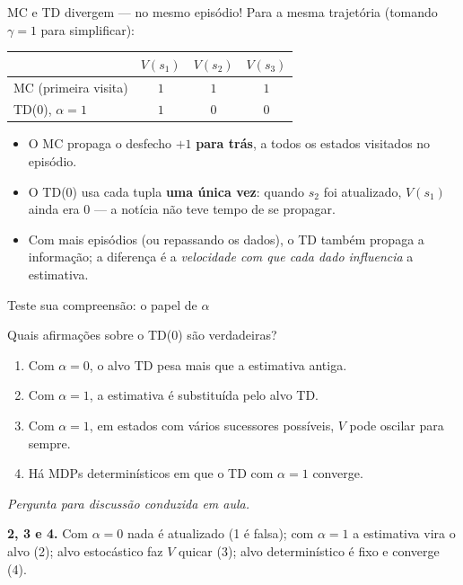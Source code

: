 \documentclass[aspectratio=169, 11pt]{beamer}
\newcommand{\paradiscussao}{\vspace{-0.2em}
  {\footnotesize\color{rlCinza}\itshape Pergunta para discussão conduzida em aula.}}
\begin{document}
\begin{frame}{MC e TD divergem — no mesmo episódio!}
  Para a mesma trajetória (tomando $\gamma = 1$ para simplificar):
  \begin{center}
  \renewcommand{\arraystretch}{1.3}
  \begin{tabular}{lccc}
    & $V(s_1)$ & $V(s_2)$ & $V(s_3)$ \\ \hline
    MC (primeira visita) & $1$ & $1$ & $1$ \\
    TD(0), $\alpha = 1$  & $1$ & $0$ & $0$ \\
  \end{tabular}
  \end{center}

  \begin{itemize}
    \item O MC propaga o desfecho $+1$ \textbf{para trás}, a todos os
      estados visitados no episódio.
    \item O TD(0) usa cada tupla \textbf{uma única vez}: quando $s_2$ foi
      atualizado, $V(s_1)$ ainda era $0$ — a notícia não teve tempo de
      se propagar.
    \item Com mais episódios (ou repassando os dados), o TD também propaga
      a informação; a diferença é a \emph{velocidade com que cada dado
      influencia} a estimativa.
  \end{itemize}
\end{frame}

\begin{frame}{Teste sua compreensão: o papel de $\alpha$}
  \begin{quizbox}{}
    Quais afirmações sobre o TD(0) são verdadeiras?
    \begin{enumerate}\setlength{\itemsep}{0ex}
      \item Com $\alpha = 0$, o alvo TD pesa mais que a estimativa antiga.
      \item Com $\alpha = 1$, a estimativa é substituída pelo alvo TD.
      \item Com $\alpha = 1$, em estados com vários sucessores possíveis,
        $V$ pode oscilar para sempre.
      \item Há MDPs determinísticos em que o TD com $\alpha = 1$ converge.
    \end{enumerate}
  \end{quizbox}
  \paradiscussao

  \pause
  \begin{respbox}
    \textbf{2, 3 e 4.} Com $\alpha = 0$ nada é atualizado (1 é falsa);
    com $\alpha = 1$ a estimativa vira o alvo (2); alvo estocástico faz
    $V$ quicar (3); alvo determinístico é fixo e converge (4).
  \end{respbox}
\end{frame}
\end{document}
